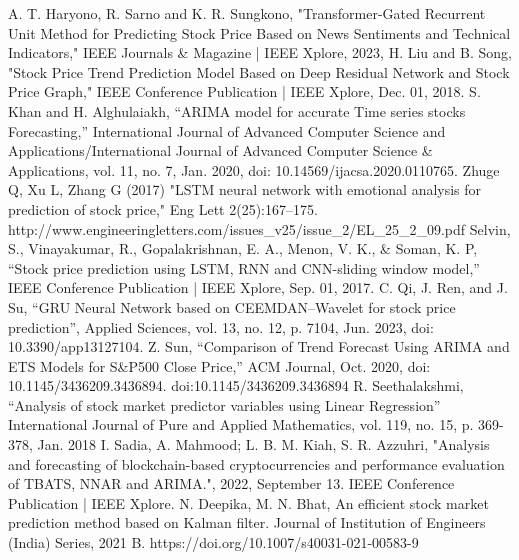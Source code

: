 \documentclass[conference]{IEEEtran}
\begin{document}
\begin{thebibliography}{00}
A. T. Haryono, R. Sarno and K. R. Sungkono, "Transformer-Gated Recurrent Unit Method for Predicting Stock Price Based on News Sentiments and Technical Indicators," IEEE Journals \& Magazine | IEEE Xplore, 2023, 
H. Liu and B. Song, "Stock Price Trend Prediction Model Based on Deep Residual Network and Stock Price Graph," IEEE Conference Publication | IEEE Xplore, Dec. 01, 2018. 
S. Khan and H. Alghulaiakh, “ARIMA model for accurate Time series stocks Forecasting,” International Journal of Advanced Computer Science and Applications/International Journal of Advanced Computer Science \& Applications, vol. 11, no. 7, Jan. 2020, doi: 10.14569/ijacsa.2020.0110765.
Zhuge Q, Xu L, Zhang G (2017) "LSTM neural network with emotional analysis for prediction of stock price," Eng Lett 2(25):167–175. http://www.engineeringletters.com/issues\_v25/issue\_2/EL\_25\_2\_09.pdf
Selvin, S., Vinayakumar, R., Gopalakrishnan, E. A., Menon, V. K., \& Soman, K. P, “Stock price prediction using LSTM, RNN and CNN-sliding window model,” IEEE Conference Publication | IEEE Xplore, Sep. 01, 2017. 
C. Qi, J. Ren, and J. Su, “GRU Neural Network based on CEEMDAN–Wavelet for stock price prediction”, Applied Sciences, vol. 13, no. 12, p. 7104, Jun. 2023, doi: 10.3390/app13127104.
Z. Sun, “Comparison of Trend Forecast Using ARIMA and ETS Models for S\&P500 Close Price,” ACM Journal, Oct. 2020, doi: 10.1145/3436209.3436894. 
doi:10.1145/3436209.3436894
R. Seethalakshmi, “Analysis of stock market predictor variables using Linear Regression” International Journal of Pure and Applied Mathematics, vol. 119, no. 15, p. 369-378, Jan. 2018
 I. Sadia, A. Mahmood; L. B. M. Kiah, S. R. Azzuhri, "Analysis and forecasting of blockchain-based cryptocurrencies and performance evaluation of TBATS, NNAR and ARIMA.", 2022, September 13. IEEE Conference Publication | IEEE Xplore. 
 N. Deepika, M. N. Bhat,  An efficient stock market prediction method based on Kalman filter. Journal of Institution of Engineers (India) Series, 2021 B. https://doi.org/10.1007/s40031-021-00583-9


\end{thebibliography}
\end{document}
